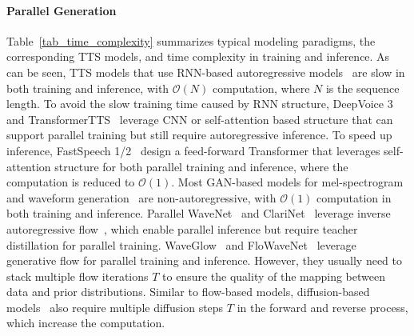 \documentclass{article}
\begin{document}
\paragraph{Parallel Generation} Table~\ref{tab_time_complexity} summarizes typical modeling paradigms, the corresponding TTS models, and time complexity in training and inference. As can be seen, TTS models that use RNN-based autoregressive models~\cite{wang2017tacotron,shen2018natural,mehri2016samplernn,valin2019lpcnet} are slow in both training and inference, with $\mathcal{O}(N)$ computation, where $N$ is the sequence length. To avoid the slow training time caused by RNN structure, DeepVoice 3~\cite{ping2018deep} and TransformerTTS~\cite{li2019neural} leverage CNN or self-attention based structure that can support parallel training but still require autoregressive inference. To speed up inference, FastSpeech 1/2~\cite{ren2019fastspeech,ren2021fastspeech} design a feed-forward Transformer that leverages self-attention structure for both parallel training and inference, where the computation is reduced to $\mathcal{O}(1)$. Most GAN-based models for mel-spectrogram and waveform generation~\cite{kumar2019melgan,kong2020hifi,ren2021fastspeech,donahue2020end} are non-autoregressive, with $\mathcal{O}(1)$ computation in both training and inference.  Parallel WaveNet~\cite{oord2018parallel} and ClariNet~\cite{ping2018clarinet} leverage inverse autoregressive flow~\cite{kingma2016improved}, which enable parallel inference but require teacher distillation for parallel training. WaveGlow~\cite{prenger2019waveglow} and FloWaveNet~\cite{kim2019flowavenet} leverage generative flow for parallel training and inference. However, they usually need to stack multiple flow iterations $T$ to ensure the quality of the mapping between data and prior distributions. Similar to flow-based models, diffusion-based models~\cite{chen2020wavegrad,kong2020diffwave,lee2021priorgrad,jeong2021diff,popov2021grad} also require multiple diffusion steps $T$ in the forward and reverse process, which increase the computation.
\end{document}
